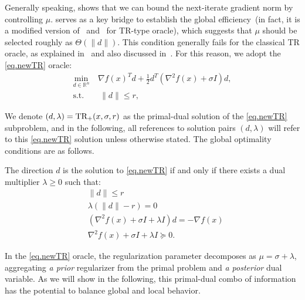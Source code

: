 \documentclass{article}
\begin{document}
Generally speaking,  shows that we can bound the next-iterate gradient norm by controlling $\mu$.
    { serves as a key bridge to establish the global efficiency~(in fact, it is a modified version of~\cite[Lemma 4.2.5]{nesterov2018lectures} and~\cite[Corollary 1]{nesterov2021implementable} for TR-type oracle)}, which suggests that $\mu$ should be selected roughly as $\Theta(\|d\|)$. This condition generally fails for the classical TR oracle, as explained in~ and also discussed in~\cite{curtis2018concise,curtis2017trust}. For this reason, we adopt the \ref{eq.newTR} oracle:
\begin{equation}\label{eq.newTR}
    \tag{TR$_+$}
    \begin{aligned}
        \min_{d \in \mathbb{R}^n}~ & \nabla f(x)^T d
        + \tfrac{1}{2} d^T (\nabla^2 f(x) + \sigma I) d, \\
        \text{s.t.}                & ~ \|d\| \le r,
    \end{aligned}
\end{equation}

We denote $(d, \lambda) = \textrm{TR}_+(x, \sigma, r)$ as the primal-dual solution of the \ref{eq.newTR} subproblem, and in the following, all references to solution pairs $(d,\lambda)$ will refer to this \ref{eq.newTR} solution unless otherwise stated.
The global optimality conditions are as follows.
\begin{lemma}\label{lem.optimal condition}
    The direction $d$ is the solution to \ref{eq.newTR} if and only if there exists a dual multiplier $\lambda \geq 0$ such that: \begin{subequations}\label{eq.sa}
        \begin{align}
            \label{eq.optcond primal}
             & \| d\| \leq r                                            \\
            \label{eq.optcond coml slack}
             & \lambda \left(\|d\|-r \right)=0                          \\ \label{eq.optcond firstorder}
             & (\nabla^2 f(x) + \sigma I + \lambda I ) d = -\nabla f(x) \\
            \label{eq.optcond secondorder}
             & \nabla^2 f(x) + \sigma I + \lambda I \succeq 0.
        \end{align}
    \end{subequations}
\end{lemma}
In the \ref{eq.newTR} oracle, the regularization parameter decomposes as $\mu=\sigma+\lambda$, aggregating \emph{a prior} regularizer from the primal problem and \emph{a posterior} dual variable. As we will show in the following, this primal-dual combo of information has the potential to balance global and local behavior.
\end{document}
